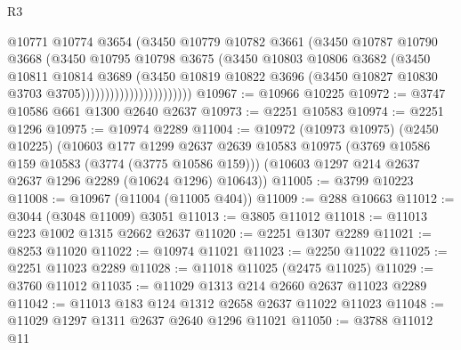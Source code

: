 \begin{lexlean}{R3}
\begin{coremodule}
                                    @10771
                                    @10774
                                    @3654
                                    (@3450
                                      @10779
                                      @10782
                                      @3661
                                      (@3450
                                        @10787
                                        @10790
                                        @3668
                                        (@3450
                                          @10795
                                          @10798
                                          @3675
                                          (@3450
                                            @10803
                                            @10806
                                            @3682
                                            (@3450
                                              @10811
                                              @10814
                                              @3689
                                              (@3450
                                                @10819
                                                @10822
                                                @3696
                                                (@3450
                                                  @10827
                                                  @10830
                                                  @3703
                                                  @3705)))))))))))))))))))))))
@10967 := @10966 @10225
@10972 := @3747 @10586 @661 @1300 @2640 @2637
@10973 := @2251 @10583
@10974 := @2251 @1296
@10975 := @10974 @2289
@11004 := @10972
    (@10973 @10975)
    (@2450 @10225)
    (@10603
      @177
      @1299
      @2637
      @2639
      @10583
      @10975
      (@3769 @10586 @159 @10583 (@3774 (@3775 @10586 @159)))
      (@10603 @1297 @214 @2637 @2637 @1296 @2289 (@10624 @1296) @10643))
@11005 := @3799 @10223
@11008 := @10967 (@11004 (@11005 @404))
@11009 := @288 @10663
@11012 := @3044 (@3048 @11009) @3051
@11013 := @3805 @11012
@11018 := @11013 @223 @1002 @1315 @2662 @2637
@11020 := @2251 @1307 @2289
@11021 := @8253 @11020
@11022 := @10974 @11021
@11023 := @2250 @11022
@11025 := @2251 @11023 @2289
@11028 := @11018 @11025 (@2475 @11025)
@11029 := @3760 @11012
@11035 := @11029 @1313 @214 @2660 @2637 @11023 @2289
@11042 := @11013 @183 @124 @1312 @2658 @2637 @11022 @11023
@11048 := @11029 @1297 @1311 @2637 @2640 @1296 @11021
@11050 := @3788 @11012 @11

\end{coremodule}
\end{lexlean}
